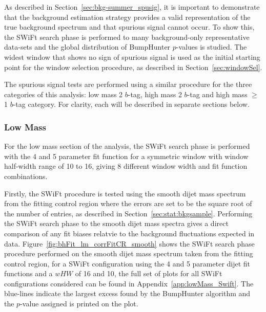As described in Section~\ref{sec:bkg-summer_spusig}, it is important to demonstrate that the background estimation strategy
provides a valid representation of the true background spectrum and that spurious signal cannot occur.
To show this, the SWiFt search phase is performed to many background-only representative
data-sets and the global distribution of {\sc BumpHunter} \mbox{$p$-value}s is studied.
The widest window that shows no sign of spurious signal is used as the initial starting point for the window selection procedure, as described in Section~\ref{sec:windowSel}.

The spurious signal tests are performed using a similar procedure for the three categories of this analysis:
low mass 2 $b$-tag, high mass 2 $b$-tag and high mass $\geq$1 $b$-tag category.
For clarity, each will be described in separate sections below.

\subsubsection{Low Mass}
\label{sec:lowmass_spuriousSignal}

For the low mass section of the analysis,
the SWiFt search phase is performed with the 4 and 5 parameter fit function for a symmetric window with window half-width range of 10 to 16,
giving 8 different window width and fit function combinations.

Firstly, the SWiFt procedure is tested using the smooth dijet mass spectrum from the fitting control region
where the errors are set to be the square root of the number of entries,
as described in Section~\ref{sec:stat:bkgsample}.
Performing the SWiFt search phase to the smooth dijet mass spectra gives a direct comparison
of any fit biases relatvie to the background fluctuations expected in data.
Figure~\ref{fig:bhFit_lm_corrFitCR_smooth} shows the SWiFt search phase procedure
performed on the smooth dijet mass spectrum taken from the fitting control region,
for a SWiFt configuration using the 4 and 5 parameter dijet fit functions and a $wHW$ of 16 and 10,
the full set of plots for all SWiFt configurations considered can be found in Appendix~\ref{app:lowMass_Swift}.
The blue-lines indicate the largest excess found by the {\sc BumpHunter} algorithm and the \mbox{$p$-value} assigned is printed on the plot. 

